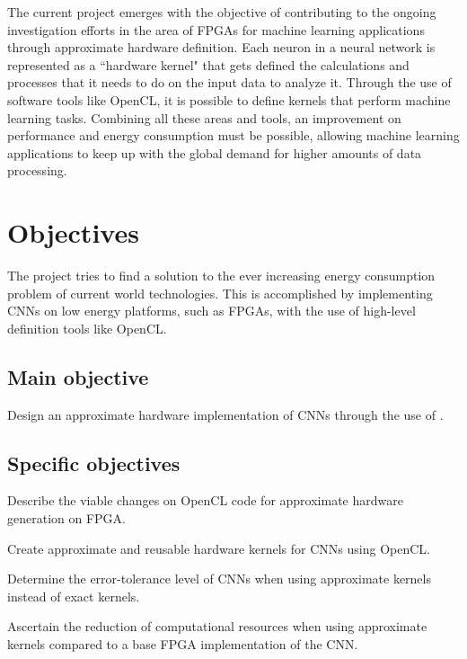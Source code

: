 The current project emerges with the objective of contributing to the ongoing investigation efforts
in the area of FPGAs for machine learning applications through approximate hardware definition.
Each neuron in a neural network is represented as a ``hardware kernel" that gets defined the 
calculations and processes that it needs to do on the input data to analyze it.
Through the use of software tools like OpenCL, it is possible to define kernels that perform
machine learning tasks. Combining all these areas and tools, an improvement on performance and
energy consumption must be possible, allowing machine learning applications to keep up
with the global demand for higher amounts of data processing.


\section{Objectives}

The project tries to find a solution to the ever increasing energy consumption problem
of current world technologies. This is accomplished by implementing CNNs on low 
energy platforms, such as
FPGAs, with the use of high-level definition tools like OpenCL.

\subsection{Main objective}

Design an approximate hardware implementation of CNNs through the 
use of \intelOCL.

\subsection{Specific objectives}

\begin{compactitem}
    \item Describe the viable changes on OpenCL code for approximate hardware generation on FPGA.
    \item Create approximate and reusable hardware kernels for CNNs using OpenCL.
    \item Determine the error-tolerance level of CNNs when using approximate kernels instead of exact kernels.
    \item Ascertain the reduction of computational resources when using approximate kernels compared to a base FPGA implementation of the CNN.
\end{compactitem}

